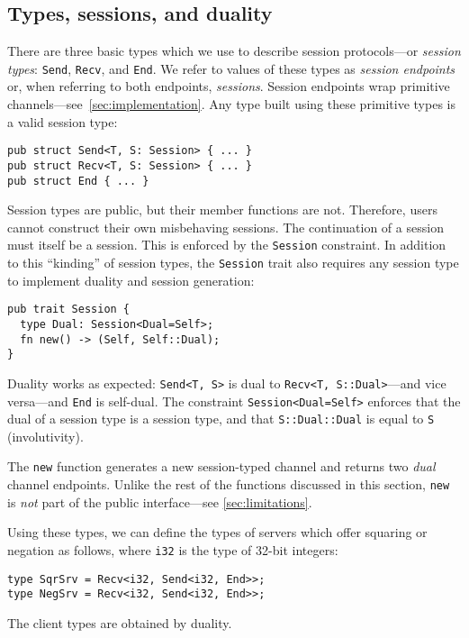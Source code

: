 \documentclass[copyright,creativecommons]{eptcs}
\begin{document}
\subsection{Types, sessions, and duality}
There are three basic types which we use to describe session protocols---or \emph{session types}: \lstinline{Send}, \lstinline{Recv}, and \lstinline{End}. We refer to values of these types as \emph{session endpoints} or, when referring to both endpoints, \emph{sessions}. Session endpoints wrap primitive channels---see~\cref{sec:implementation}. Any type built using these primitive types is a valid session type:
\begin{lstlisting}
pub struct Send<T, S: Session> { ... }
pub struct Recv<T, S: Session> { ... }
pub struct End { ... }
\end{lstlisting}
Session types are public, but their member functions are not. Therefore, users cannot construct their own misbehaving sessions. The continuation of a session must itself be a session. This is enforced by the \lstinline{Session} constraint. In addition to this ``kinding'' of session types, the \lstinline{Session} trait also requires any session type to implement duality and session generation:
\begin{lstlisting}
pub trait Session {
  type Dual: Session<Dual=Self>;
  fn new() -> (Self, Self::Dual);
}
\end{lstlisting}
Duality works as expected: \lstinline{Send<T, S>} is dual to \lstinline{Recv<T, S::Dual>}---and vice versa---and \lstinline{End} is self-dual. The constraint \lstinline{Session<Dual=Self>} enforces that the dual of a session type is a session type, and that \lstinline{S::Dual::Dual} is equal to \lstinline{S} (involutivity).

The \lstinline{new} function generates a new session-typed channel and returns two \emph{dual} channel endpoints. Unlike the rest of the functions discussed in this section, \lstinline{new} is \emph{not} part of the public interface---see \cref{sec:limitations}.

Using these types, we can define the types of servers which offer squaring or negation as follows, where \lstinline{i32} is the type of 32-bit integers:
\begin{lstlisting}
type SqrSrv = Recv<i32, Send<i32, End>>;
type NegSrv = Recv<i32, Send<i32, End>>;
\end{lstlisting}
The client types are obtained by duality.
\end{document}
